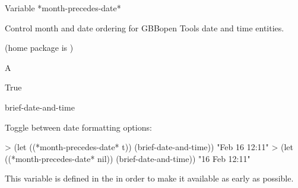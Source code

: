 \documentclass[10pt,twoside,english,pdftex]{article}
\begin{document}
\begin{functiondoc}{Variable}%
{*month-precedes-date*}{}%

\fnsyntax

\fnpurpose Control month and date ordering for GBBopen Tools date and time
entities.

\fnpackage {} (home package is )

\fnmodule {}

\fnvaluetype A 

\fninitialvalue True

\begin{alsos}{brief-date-and-time}
\end{alsos}

\fnexamples
Toggle between date formatting options:
%
\W\supp
\begin{example}
> (let ((*month-precedes-date* t))
    (brief-date-and-time))
"Feb 16 12:11"
> (let ((*month-precedes-date* nil))
    (brief-date-and-time))
"16 Feb 12:11"
\end{example}

\fnnote
{}%
%
%
This variable is defined in the   in order to
make it available as early as possible.

\end{functiondoc}

\end{document}
